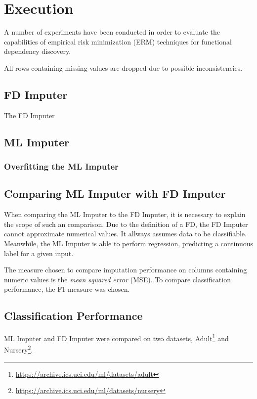 \newpage
\section{Execution}
A number of experiments have been conducted in order to evaluate the capabilities of empirical risk minimization (ERM) techniques for functional dependency discovery.

All rows containing missing values are dropped due to possible inconsistencies.

\subsection{FD Imputer}
The FD Imputer

\subsection{ML Imputer}

\subsubsection{Overfitting the ML Imputer}

\subsection{Comparing ML Imputer with FD Imputer}
When comparing the ML Imputer to the FD Imputer, it is necessary to explain the scope of such an comparison.
Due to the definition of a FD, the FD Imputer cannot approximate numerical values.
It allways assumes data to be classifiable.
Meanwhile, the ML Imputer is able to perform regression, predicting a continuous label for a given input.

The measure chosen to compare imputation performance on columns containing numeric values is the \emph{mean squared error} (MSE).
To compare classification performance, the F1-measure was chosen.


\subsection{Classification Performance}
ML Imputer and FD Imputer were compared on two datasets, Adult\footnote{\url{https://archive.ics.uci.edu/ml/datasets/adult}} and Nursery\footnote{\url{https://archive.ics.uci.edu/ml/datasets/nursery}}.

